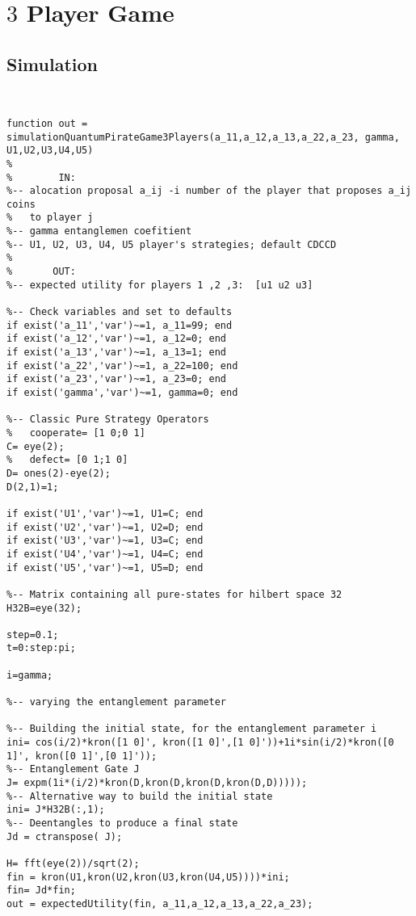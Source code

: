 \label{ap:d}

\section{$3$ Player Game}

\subsection{Simulation}
\begin{lstlisting}


function out = simulationQuantumPirateGame3Players(a_11,a_12,a_13,a_22,a_23, gamma, U1,U2,U3,U4,U5)
%
%        IN:
%-- alocation proposal a_ij -i number of the player that proposes a_ij coins
%   to player j
%-- gamma entanglemen coefitient
%-- U1, U2, U3, U4, U5 player's strategies; default CDCCD
%
%       OUT:
%-- expected utility for players 1 ,2 ,3:  [u1 u2 u3]

%-- Check variables and set to defaults
if exist('a_11','var')~=1, a_11=99; end
if exist('a_12','var')~=1, a_12=0; end
if exist('a_13','var')~=1, a_13=1; end
if exist('a_22','var')~=1, a_22=100; end
if exist('a_23','var')~=1, a_23=0; end
if exist('gamma','var')~=1, gamma=0; end

%-- Classic Pure Strategy Operators
%   cooperate= [1 0;0 1]
C= eye(2);
%   defect= [0 1;1 0]
D= ones(2)-eye(2);
D(2,1)=1;

if exist('U1','var')~=1, U1=C; end
if exist('U2','var')~=1, U2=D; end
if exist('U3','var')~=1, U3=C; end
if exist('U4','var')~=1, U4=C; end
if exist('U5','var')~=1, U5=D; end

%-- Matrix containing all pure-states for hilbert space 32
H32B=eye(32);

step=0.1;
t=0:step:pi;

i=gamma;

%-- varying the entanglement parameter

%-- Building the initial state, for the entanglement parameter i
ini= cos(i/2)*kron([1 0]', kron([1 0]',[1 0]'))+1i*sin(i/2)*kron([0 1]', kron([0 1]',[0 1]'));
%-- Entanglement Gate J
J= expm(1i*(i/2)*kron(D,kron(D,kron(D,kron(D,D)))));
%-- Alternative way to build the initial state
ini= J*H32B(:,1);
%-- Deentangles to produce a final state
Jd = ctranspose( J);

H= fft(eye(2))/sqrt(2);
fin = kron(U1,kron(U2,kron(U3,kron(U4,U5))))*ini;
fin= Jd*fin;
out = expectedUtility(fin, a_11,a_12,a_13,a_22,a_23);


\end{lstlisting}
